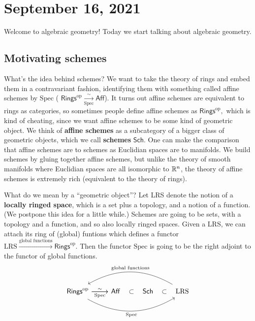 \section{September 16, 2021} 
Welcome to algebraic geometry! Today we start talking about algebraic geometry.

\subsection{Motivating schemes}
What's the idea behind schemes? We want to take the theory of rings and embed them in a contravariant fashion, identifying them with something called affine schemes by $\mathrm{Spec}$ ( $\mathsf{Rings} ^{\mathrm{op}}\underset{\mathrm{Spec}}{\xrightarrow{\sim}} \mathsf{Aff}  $). It turns out affine schemes are equivalent to rings as categories, so sometimes people define affine schemes as $\mathsf{Rings} ^{\mathrm{op}}, $ which is kind of cheating, since we want affine schemes to be some kind of geometric object. We think of \textbf{affine schemes} as a subcategory of a bigger class of geometric objects, which we call \textbf{schemes} $\mathsf{Sch} $. One can make the comparison that affine schemes are to schemes as Euclidian spaces are to manifolds. We build schemes by gluing together affine schemes, but unlike the theory of smooth manifolds where Euclidian spaces are all isomorphic to $\mathbb{R}^n $, the theory of affine schemes is extremely rich (equivalent to the theory of rings).

What do we mean by a ``geometric object''? Let LRS denote the notion of a \textbf{locally ringed space}, which is a set plus a topology, and a notion of a function. (We postpone this idea for a little while.) Schemes are going to be sets, with a topology and a function, and so also locally ringed spaces. Given a LRS, we can attach its ring of (global) funtions which defines a functor $\mathrm{LRS}\xrightarrow{\text{global functions} } \mathsf{Rings} ^{\mathrm{op}} $. Then the functor $\mathrm{Spec}$ is going to be the right adjoint to the functor of global functions.\[
\begin{tikzcd}
    \mathsf{Rings}^{\mathrm{op}} \arrow[r, "\sim"] \arrow[r, "\mathrm{Spec}"'] \arrow[rrr, "\mathrm{Spec}"', bend right, shift right] & \mathsf{Aff} \arrow[r, "\subset", phantom] & \mathsf{Sch} \arrow[r, "\subset", phantom] & \mathrm{LRS} \arrow[lll, "\text{global functions}"', bend right, shift right]
\end{tikzcd}
\] 

